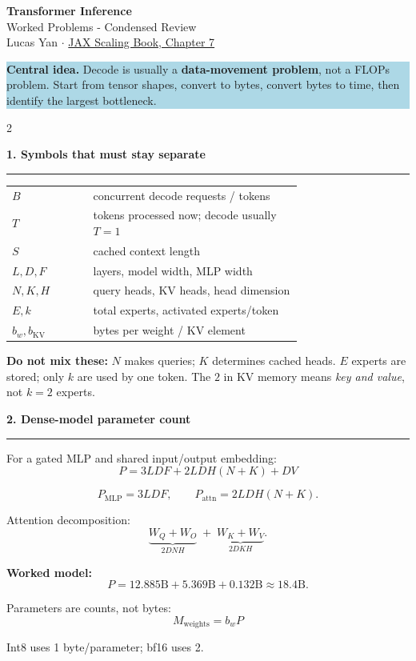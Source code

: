 \documentclass[8pt,a4paper]{extarticle}
\newcommand{\sect}[1]{%
  \vspace{2pt}%
  {\color{DeepBlue}\normalsize\bfseries #1}\par
  \vspace{0.5pt}\hrule\vspace{1.5pt}
}
\newcommand{\formula}[1]{%
  \[
    \boxed{\displaystyle #1}
  \]
}
\newcommand{\callout}[2][LightBlue]{%
  \vspace{1pt}\noindent
  \colorbox{#1}{%
    \parbox{\dimexpr\linewidth-2\fboxsep\relax}{\footnotesize #2}%
  }\vspace{1pt}
}
\begin{document}
\begin{center}
{\color{DeepBlue}\Large\bfseries Transformer Inference}\\[-1pt]
{\normalsize Worked Problems - Condensed Review}\\[1pt]
{\scriptsize Lucas Yan \quad$\cdot$\quad
\href{https://jax-ml.github.io/scaling-book/inference/}{JAX Scaling Book, Chapter 7}}
\end{center}

\callout{%
\textbf{Central idea.} Decode is usually a \textbf{data-movement problem}, not
a FLOPs problem. Start from tensor shapes, convert to bytes, convert bytes to
time, then identify the largest bottleneck.
}

\begin{multicols}{2}

\sect{1. Symbols that must stay separate}

\begin{tabular}{@{}>{$}l<{$} p{0.72\linewidth}@{}}
\toprule
B & concurrent decode requests / tokens\\
T & tokens processed now; decode usually $T=1$\\
S & cached context length\\
L,D,F & layers, model width, MLP width\\
N,K,H & query heads, KV heads, head dimension\\
E,k & total experts, activated experts/token\\
b_w,b_{\mathrm{KV}} & bytes per weight / KV element\\
\bottomrule
\end{tabular}

\callout[Warm]{%
\textbf{Do not mix these:}
$N$ makes queries; $K$ determines cached heads.
$E$ experts are stored; only $k$ are used by one token.
The $2$ in KV memory means \emph{key and value}, not $k=2$ experts.
}

\sect{2. Dense-model parameter count}

For a gated MLP and shared input/output embedding:
\formula{P=3LDF+2LDH(N+K)+DV}

\[
P_{\mathrm{MLP}}=3LDF,\qquad
P_{\mathrm{attn}}=2LDH(N+K).
\]

Attention decomposition:
\[
\underbrace{W_Q+W_O}_{2DNH}
\;+\;
\underbrace{W_K+W_V}_{2DKH}.
\]

\textbf{Worked model:}
\[
P=12.885\mathrm{B}+5.369\mathrm{B}+0.132\mathrm{B}
\approx\boxed{18.4\mathrm{B}}.
\]

Parameters are counts, not bytes:
\formula{M_{\mathrm{weights}}=b_wP}
Int8 uses 1 byte/parameter; bf16 uses 2.


\end{multicols}
\end{document}
